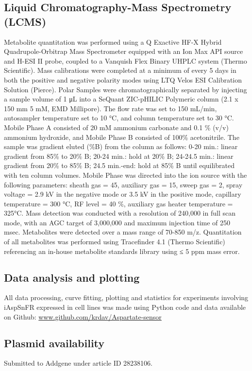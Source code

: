 \documentclass[9pt,lineno]{elife}
\begin{document}
\subsection{Liquid Chromatography-Mass Spectrometry (LCMS)}
Metabolite quantitation was performed using a Q Exactive HF-X Hybrid Quadrupole-Orbitrap Mass Spectrometer equipped with an Ion Max API source and H-ESI II probe, coupled to a Vanquish Flex Binary UHPLC system (Thermo Scientific).
Mass calibrations were completed at a minimum of every 5 days in both the positive and negative polarity modes using LTQ Velos ESI Calibration Solution (Pierce).
Polar Samples were chromatographically separated by injecting a sample volume of 1 μL into a SeQuant ZIC-pHILIC Polymeric column (2.1 x 150 mm 5 mM, EMD Millipore).
The flow rate was set to 150 mL/min, autosampler temperature set to 10 °C, and column temperature set to 30 °C.
Mobile Phase A consisted of 20 mM ammonium carbonate and 0.1 \% (v/v) ammonium hydroxide, and Mobile Phase B consisted of 100\% acetonitrile.
The sample was gradient eluted (\%B) from the column as follows: 0-20 min.: linear gradient from 85\% to 20\% B; 20-24 min.: hold at 20\% B; 24-24.5 min.: linear gradient from 20\% to 85\% B; 24.5 min.-end: hold at 85\% B until equilibrated with ten column volumes.
Mobile Phase was directed into the ion source with the following parameters: sheath gas = 45, auxiliary gas = 15, sweep gas = 2, spray voltage = 2.9 kV in the negative mode or 3.5 kV in the positive mode, capillary temperature = 300 °C, RF level = 40 \%, auxiliary gas heater temperature = 325°C.
Mass detection was conducted with a resolution of 240,000 in full scan mode, with an AGC target of 3,000,000 and maximum injection time of 250 msec.
Metabolites were detected over a mass range of 70-850 m/z.
Quantitation of all metabolites was performed using Tracefinder 4.1 (Thermo Scientific) referencing an in-house metabolite standards library using ≤ 5 ppm mass error.

\subsection{Data analysis and plotting}
All data processing, curve fitting, plotting and statistics for experiments involving iAspSnFR expressed in cell lines was made using Python code and data available on Github:
\url{www.github.com/krdav/Aspartate-sensor}

\subsection{Plasmid availability}
Submitted to Addgene under article ID 28238106.






\end{document}
